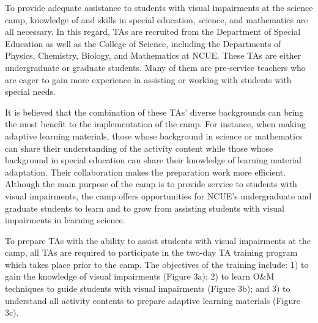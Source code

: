 \documentclass[11.5pt]{sig-alternate} %
\begin{document}
\begin{large}
To provide adequate assistance to students with visual impairments at the science camp, knowledge of and skills in special education, science, and mathematics are all necessary. In this regard, TAs are recruited from the Department of Special Education as well as the College of Science, including the Departments of Physics, Chemistry, Biology, and Mathematics at NCUE. These TAs are either undergraduate or graduate students. Many of them are pre-service teachers who are eager to gain more experience in assisting or working with students with special needs.

It is believed that the combination of these TAs’ diverse backgrounds can bring the most benefit to the implementation of the camp. For instance, when making adaptive learning materials, those whose background in science or mathematics can share their understanding of the activity content while those whose background in special education can share their knowledge of learning material adaptation. Their collaboration makes the preparation work more efficient. Although the main purpose of the camp is to provide service to students with visual impairments, the camp offers opportunities for NCUE’s undergraduate and graduate students to learn and to grow from assisting students with visual impairments in learning science.  

To prepare TAs with the ability to assist students with visual impairments at the camp, all TAs are required to participate in the two-day TA training program which takes place prior to the camp. The objectives of the training include: 1) to gain the knowledge of visual impairments (Figure 3a); 2) to learn O\&M techniques to guide students with visual impairments (Figure 3b); and 3) to understand all activity contents to prepare adaptive learning materials (Figure 3c).


\end{large}
\end{document}
